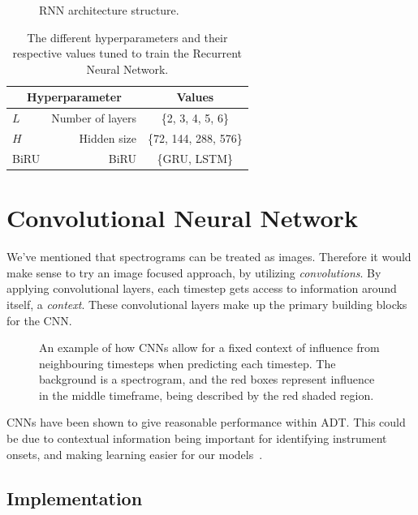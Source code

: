 \begin{figure}[H]
    \centering
    
    \caption{RNN architecture structure.}
    \label{RNNFigure}
\end{figure}

\begin{table}[H]
    \centering
    \begin{tabular}{lr|c}
        \multicolumn{2}{c|}{Hyperparameter} & Values       \\
        \hline
        $L$ & Number of layers      & \{2, 3, 4, 5, 6\} \\
        $H$ & Hidden size      & \{72, 144, 288, 576\} \\
        \gls{BiRU} & \acrlong{BiRU} & \{\gls{GRU}, \gls{LSTM}\}\\
    \end{tabular}
    \caption{The different hyperparameters and their respective values tuned to train the Recurrent Neural Network.}
    \label{RNNHyperparams}
\end{table}

\section{Convolutional Neural Network}

We've mentioned that spectrograms can be treated as images. Therefore it would make sense to try an image focused approach, by utilizing \textit{convolutions}. By applying convolutional layers, each timestep gets access to information around itself, a \textit{context}. These convolutional layers make up the primary building blocks for the \gls{CNN}.

\begin{figure}[H]
    \centering
    
    \caption{An example of how \glspl{CNN} allow for a fixed context of influence from neighbouring timesteps when predicting each timestep. The background is a spectrogram, and the red boxes represent influence in the middle timeframe, being described by the red shaded region.}
    \label{CNNInfluenceFigure}
\end{figure}

\glspl{CNN} have been shown to give reasonable performance within \gls{ADT}. This could be due to contextual information being important for identifying instrument onsets, and making learning easier for our models~\cite{Vogl2017DrumTV}.

\subsection{Implementation}

